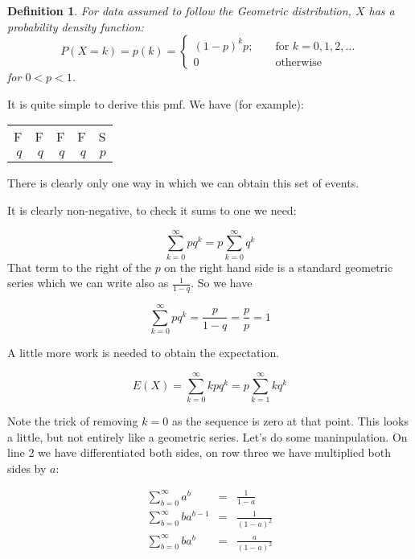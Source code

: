 \documentclass[12pt]{extbook}
\newtheorem{df}{Definition}[section]
\begin{document}
\begin{df}
For data assumed to follow the Geometric distribution, $X$ has a probability density function:
\begin{displaymath}
P(X=k) = p(k) =  \left\{ \begin{array}{crr} (1-p)^{k}p; & & \mbox{ for } k=0,1,2,\ldots\\
0 & & \mbox{ otherwise } \end{array} \right.
\end{displaymath}
for $0 < p < 1$.
\end{df}



It is quite simple to derive this pmf.   We have (for example):
\begin{tabular}{rrrrr}
F & F & F & F & S \\
$q$ & $q$ & $q$ & $q$ & $p$
\end{tabular}

There is clearly only one way in which we can obtain this set of events.

It is clearly non-negative, to check it sums to one we need:

\begin{displaymath}
\sum_{k=0}^{\infty} pq^{k} = p \sum_{k=0}^{\infty} q^{k}
\end{displaymath}
That term to the right of the $p$ on the right hand side is a standard geometric series which we can write also as $\frac{1}{1-q}$.   So we have 


\begin{displaymath}
\sum_{k=0}^{\infty} pq^k = \frac{p}{1-q} = \frac{p}{p} = 1
\end{displaymath}


A little more work is needed to obtain the expectation.

\begin{displaymath}
E(X) = \sum_{k=0}^{\infty} k p q^k =  p \sum_{k=1}^{\infty} k q^k
\end{displaymath}

Note the trick of removing $k=0$ as the sequence is zero at that point.   This looks a little, but not entirely like a geometric series.   Let's do some maninpulation.  On line 2 we have differentiated both sides, on row three we have multiplied both sides by $a$:

\begin{eqnarray*}
\sum_{b=0}^{\infty} a^b &=& \frac{1}{1-a} \\
\sum_{b=0}^{\infty} b a^{b-1} &=& \frac{1}{(1-a)^2} \\
\sum_{b=0}^{\infty} b a^{b} &=& \frac{a}{(1-a)^2} \\
\end{eqnarray*}
\end{document}
